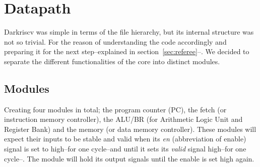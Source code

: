 \section{Datapath}
\label{sec:datapath}

Darkriscv was simple in terms of the file hierarchy, but its internal structure
was not so trivial. For the reason of understanding the code accordingly and
preparing it for the next step--explained in section~\ref{sec:referee}--. We decided to
separate the different functionalities of the core into distinct modules.

\subsection{Modules}

Creating four modules in total; the program counter (PC), the fetch (or
instruction memory controller), the ALU/BR (for Arithmetic Logic Unit and
Register Bank) and the memory (or data memory controller). These modules will
expect their inputs to be stable and valid when its \textit{en} (abbreviation of
enable) signal is set to high--for one cycle--and until it sets its \textit{valid}
signal high--for one cycle--. The module will hold its output signals until the
enable is set high again.


